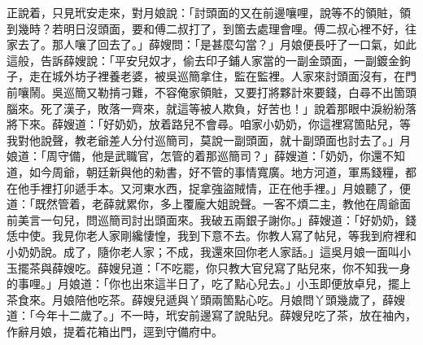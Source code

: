 正說着，只見玳安走來，對月娘說：「討頭面的又在前邊嚷哩，說等不的領賍，領到幾時？若明日沒頭面，要和傅二叔打了，到箇去處理會哩。傅二叔心裡不好，往家去了。那人嚷了回去了。」薛嫂問：「是甚麼勾當？」月娘便長吁了一口氣，如此這般，告訴薛嫂說：「平安兒奴才，偷去印子鋪人家當的一副金頭面，一副鍍金鉤子，走在城外坊子裡養老婆，被吳巡簡拿住，監在監裡。人家來討頭面沒有，在門前嚷鬧。吳巡簡又勒掯刁難，不容俺家領賍，又要打將夥計來要錢，白尋不出箇頭腦來。死了漢子，敗落一齊來，就這等被人欺負，好苦也！」說着那眼中淚紛紛落將下來。{}薛嫂道：「好奶奶，放着路兒不會尋。咱家小奶奶，你這裡寫箇貼兒，等我對他說聲，教老爺差人分付巡簡司，莫說一副頭面，就十副頭面也討去了。」月娘道：「周守備，他是武職官，怎管的着那巡簡司？」薛嫂道：「奶奶，你還不知道，如今周爺，朝廷新與他的勑書，好不管的事情寬廣。地方河道，軍馬錢糧，都在他手裡打卯遞手本。又河東水西，捉拿強盜賊情，正在他手裡。」月娘聽了，便道：「既然管着，老薛就累你，多上覆龐大姐說聲。一客不煩二主，教他在周爺面前美言一句兒，問巡簡司討出頭面來。我破五兩銀子謝你。」薛嫂道：「好奶奶，錢恁中使。我見你老人家剛纔悽惶，我到下意不去。你教人寫了帖兒，等我到府裡和小奶奶說。成了，隨你老人家；不成，我還來回你老人家話。」這吳月娘一面叫小玉擺茶與薛嫂吃。薛嫂兒道：「不吃罷，你只教大官兒寫了貼兒來，你不知我一身的事哩。」月娘道：「你也出來這半日了，吃了點心兒去。」小玉即便放卓兒，擺上茶食來。月娘陪他吃茶。薛嫂兒遞與丫頭兩箇點心吃。月娘問丫頭幾歲了，薛嫂道：「今年十二歲了。」不一時，玳安前邊寫了說貼兒。薛嫂兒吃了茶，放在袖內，作辭月娘，提着花箱出門，逕到守備府中。

